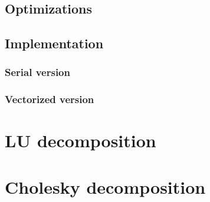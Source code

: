 \documentclass[fontsize = 10pt,DIV = 13]{scrartcl}
\begin{document}
\subsection{Optimizations}

\subsection{Implementation}
\subsubsection{Serial version}
\subsubsection{Vectorized version}

\section{LU decomposition}

\section{Cholesky decomposition}
\end{document}
